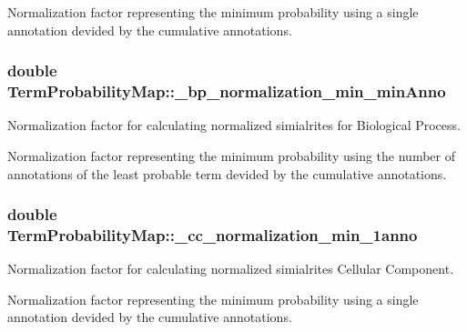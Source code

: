 Normalization factor representing the minimum probability using a single annotation devided by the cumulative annotations. 
\subsubsection[{\texorpdfstring{\+\_\+bp\+\_\+normalization\+\_\+min\+\_\+min\+Anno}{_bp_normalization_min_minAnno}}]{\setlength{\rightskip}{0pt plus 5cm}double Term\+Probability\+Map\+::\+\_\+bp\+\_\+normalization\+\_\+min\+\_\+min\+Anno\hspace{0.3cm}{\ttfamily [protected]}}\hypertarget{classTermProbabilityMap_aedd2c51ffd41664ef2dd714bde4aa5fa}{}\label{classTermProbabilityMap_aedd2c51ffd41664ef2dd714bde4aa5fa}


Normalization factor for calculating normalized simialrites for Biological Process. 

Normalization factor representing the minimum probability using the number of annotations of the least probable term devided by the cumulative annotations. 
\subsubsection[{\texorpdfstring{\+\_\+cc\+\_\+normalization\+\_\+min\+\_\+1anno}{_cc_normalization_min_1anno}}]{\setlength{\rightskip}{0pt plus 5cm}double Term\+Probability\+Map\+::\+\_\+cc\+\_\+normalization\+\_\+min\+\_\+1anno\hspace{0.3cm}{\ttfamily [protected]}}\hypertarget{classTermProbabilityMap_a8c16045a4e738758ff5510c04da20290}{}\label{classTermProbabilityMap_a8c16045a4e738758ff5510c04da20290}


Normalization factor for calculating normalized simialrites Cellular Component. 

Normalization factor representing the minimum probability using a single annotation devided by the cumulative annotations. 
